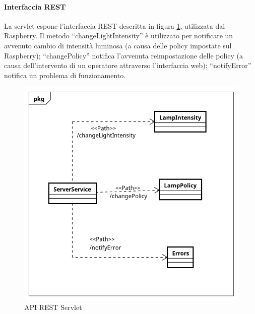 \paragraph{Interfaccia REST}
La servlet espone l'interfaccia REST descritta in figura \ref{API REST SERVLET}, utilizzata dai Raspberry. Il metodo ``changeLightIntensity'' è utilizzato per notificare un avvenuto cambio di intensità luminosa (a causa delle policy impostate sul Raspberry); ``changePolicy'' notifica l'avvenuta reimpostazione delle policy (a causa dell'intervento di un operatore attraverso l'interfaccia web); ``notifyError'' notifica un problema di funzionamento.
\begin{figure}[tbp]
	\centering
	\includegraphics[scale=.8]{figure/Class_Diagram_Server_REST.png}
	\caption{API REST Servlet \label{API REST SERVLET}}
\end{figure}

